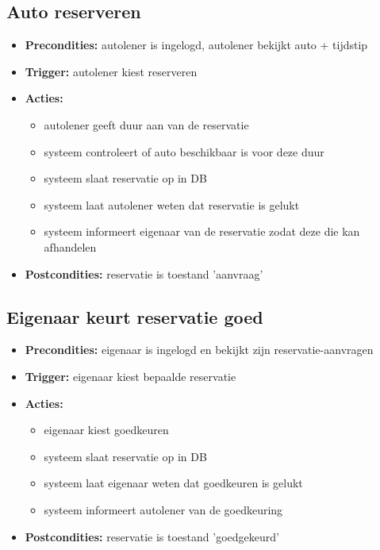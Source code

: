 \documentclass[11pt,a4paper,oneside]{article}
\begin{document}
\subsection{Auto reserveren} \label{reserveren}
\begin{itemize}
\item \textbf{Precondities:} autolener is ingelogd, autolener bekijkt auto + tijdstip
\item \textbf{Trigger:} autolener kiest reserveren
\item \textbf{Acties:} \begin{itemize}
\item 	autolener geeft duur aan van de reservatie
\item systeem controleert of auto beschikbaar is voor deze duur
\item systeem slaat reservatie op in DB
\item      systeem laat autolener weten dat reservatie is gelukt
\item      systeem informeert eigenaar van de reservatie zodat deze die kan afhandelen
\end{itemize}
\item \textbf{Postcondities:} reservatie is toestand 'aanvraag'
\end{itemize}


\subsection{Eigenaar keurt reservatie goed}
\begin{itemize}
\item \textbf{Precondities:} eigenaar is ingelogd en bekijkt zijn reservatie-aanvragen \item \textbf{Trigger:} eigenaar kiest bepaalde reservatie
\item \textbf{Acties:} \begin{itemize}
\item	eigenaar kiest goedkeuren
	
\item	systeem slaat reservatie op in DB
\item      systeem laat eigenaar weten dat goedkeuren is gelukt
\item      systeem informeert autolener van de goedkeuring
\end{itemize}
\item \textbf{Postcondities:} reservatie is toestand 'goedgekeurd'
\end{itemize}
\end{document}
